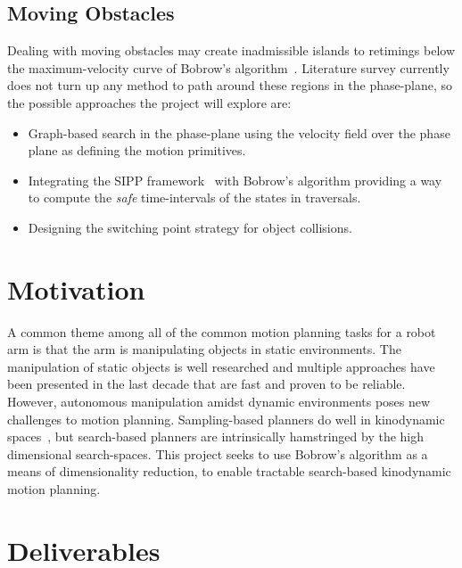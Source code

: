 \documentclass[letterpaper,10pt]{article} %
\begin{document}
\subsection{Moving Obstacles}\label{subsec:movobs}
Dealing with moving obstacles may create inadmissible islands to retimings below the maximum-velocity curve of Bobrow's algorithm~\cite{shin1985minimum}. Literature survey currently does not turn up any method to path around these regions in the phase-plane, so the possible approaches the project will explore are:

\begin{itemize}
\item Graph-based search in the phase-plane using the velocity field over the phase plane as defining the motion primitives.
\item Integrating the SIPP framework~\cite{phillips2011sipp} with Bobrow's algorithm providing a way to compute the \emph{safe} time-intervals of the states in traversals.
\item Designing the switching point strategy for object collisions.
\end{itemize}


\section{Motivation}

A common theme among all of the common motion planning tasks for a robot arm is that the arm is manipulating objects in static environments. The manipulation of static objects is well researched and multiple approaches have been presented in the last decade  that are fast and proven to be reliable. However, autonomous manipulation amidst dynamic environments poses new challenges to motion planning. Sampling-based planners do well in kinodynamic spaces~\cite{lavalle2001randomized}, but search-based planners are intrinsically hamstringed by the high dimensional search-spaces. This project seeks to use Bobrow's algorithm as a means of dimensionality reduction, to enable tractable search-based kinodynamic motion planning.


\section{Deliverables}
\end{document}
